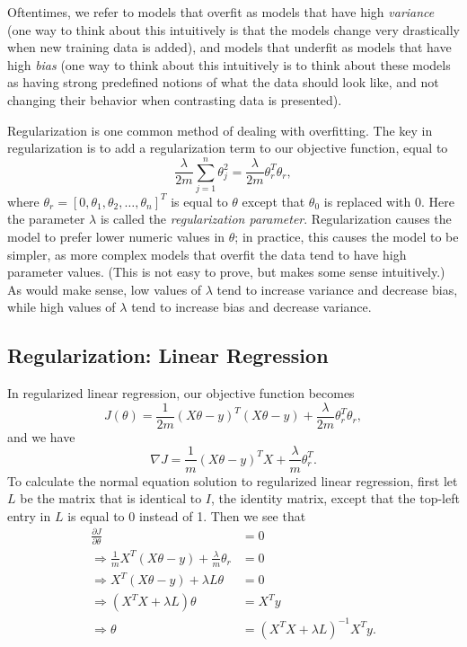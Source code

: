 \documentclass{article}
\begin{document}
Oftentimes, we refer to models that overfit as models that have high \emph{variance} (one way to think about this intuitively is that the models change very drastically when new training data is added), and models that underfit as models that have high \emph{bias} (one way to think about this intuitively is to think about these models as having strong predefined notions of what the data should look like, and not changing their behavior when contrasting data is presented).

Regularization is one common method of dealing with overfitting. The key in regularization is to add a regularization term to our objective function, equal to 
$$\frac{\lambda}{2m}\sum_{j=1}^{n} \theta_j^2 = \frac{\lambda}{2m}\theta_r^T\theta_r,$$
where $\theta_r = [0, \theta_1, \theta_2, \dots, \theta_n]^T$ is equal to $\theta$ except that $\theta_0$ is replaced with 0. Here the parameter $\lambda$ is called the \emph{regularization parameter}. Regularization causes the model to prefer lower numeric values in $\theta$; in practice, this causes the model to be simpler, as more complex models that overfit the data tend to have high parameter values. (This is not easy to prove, but makes some sense intuitively.) As would make sense, low values of $\lambda$ tend to increase variance and decrease bias, while high values of $\lambda$ tend to increase bias and decrease variance.

\subsection{Regularization: Linear Regression}
In regularized linear regression, our objective function becomes
$$J(\theta) = \frac{1}{2m}(X\theta - y)^T(X\theta-y) + \frac{\lambda}{2m}\theta_r^T\theta_r,$$
and we have
$$\nabla J = \frac{1}{m}(X\theta - y)^T X + \frac{\lambda}{m}\theta_r^T.$$
To calculate the normal equation solution to regularized linear regression, first let $L$ be the matrix that is identical to $I$, the identity matrix, except that the top-left entry in $L$ is equal to 0 instead of 1. Then we see that
\begin{align*}
\frac{\partial J}{\partial \theta} &= 0 \\
\Rightarrow \frac{1}{m}X^T(X\theta - y) + \frac{\lambda}{m}\theta_r &= 0 \\
\Rightarrow X^T(X\theta - y) + \lambda L\theta &= 0 \\
\Rightarrow (X^TX + \lambda L)\theta &= X^Ty \\
\Rightarrow \theta &= (X^TX + \lambda L)^{-1}X^Ty.
\end{align*}
\end{document}

